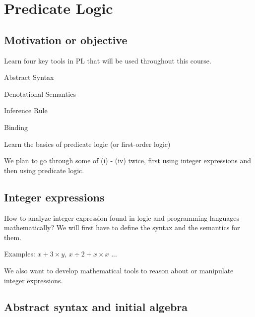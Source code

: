 
\chapter{Predicate Logic}

\section{Motivation or objective}

\begin{enumcirc}
	\item
	Learn four key tools in PL that will be used throughout this course.
	\begin{enumrm}
		\item Abstract Syntax
		\item Denotational Semantics
		\item Inference Rule
		\item Binding
	\end{enumrm}
	\item
	Learn the basics of predicate logic (or first-order logic)
	\item
	We plan to go through some of (i) - (iv) twice, first using integer expressions
	and then using predicate logic.
\end{enumcirc}

\section{Integer expressions}

\begin{enumcirc}
	\item How to analyze integer expression found in logic and programming languages
	mathematically?
	We will first have to define the syntax and the semantics for them.
	\item Examples: $x + 3 \times y$, $x \div 2 + x \times x$ ...
	\item We also want to develop mathematical tools to reason about or manipulate
	integer expressions.
\end{enumcirc}

\section{Abstract syntax and initial algebra}

